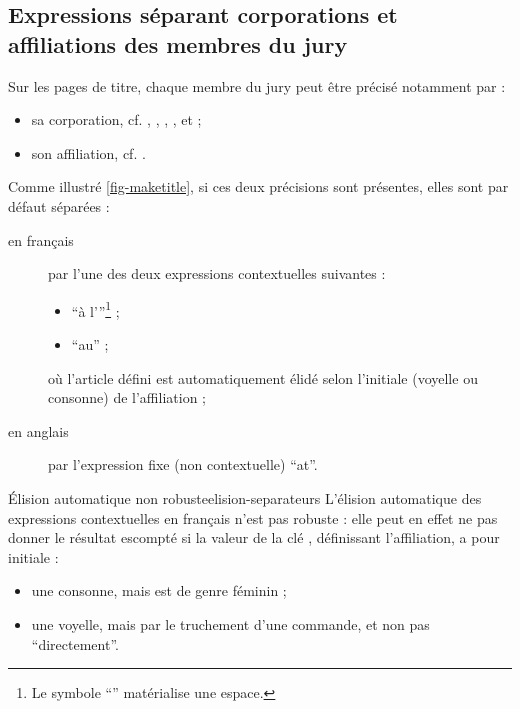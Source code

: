 \subsection{Expressions séparant corporations et affiliations des membres du jury}
\label{sec-expr-separ-les}%
%

Sur les pages de titre, chaque membre du jury peut être précisé notamment par :
\begin{itemize}
\item sa corporation, cf. , ,
  , ,
   et  ;
\item son affiliation, cf. .
\end{itemize}
Comme illustré \vref{fig-maketitle}, si ces deux précisions sont présentes,
elles sont par défaut séparées :
\begin{description}
\item[en français] par l'une des deux expressions contextuelles suivantes :
  \begin{itemize}
  \item \enquote{\textvisiblespace{}à l'}\footnote{Le symbole
      \enquote{\textvisiblespace{}} matérialise une espace.} ;
  \item \enquote{\textvisiblespace{}au\textvisiblespace{}} ;
  \end{itemize}
  où l'article défini est automatiquement élidé selon l'initiale (voyelle ou
  consonne) de l'affiliation ;
\item[en anglais] par l'expression fixe (non contextuelle)
  \enquote{\textvisiblespace{}at\textvisiblespace{}}.
\end{description}

\begin{dbwarning}{Élision automatique non robuste}{elision-separateurs}
  L'élision automatique des expressions contextuelles en français n'est pas
  robuste : elle peut en effet ne pas donner le résultat escompté si la valeur
  de la clé , définissant l'affiliation, a pour initiale :
  \begin{itemize}
  \item une consonne, mais est de genre féminin ;
  \item une voyelle, mais par le truchement d'une commande\commandeacronyme, et
    non pas \enquote{directement}.
  \end{itemize}
\end{dbwarning}

